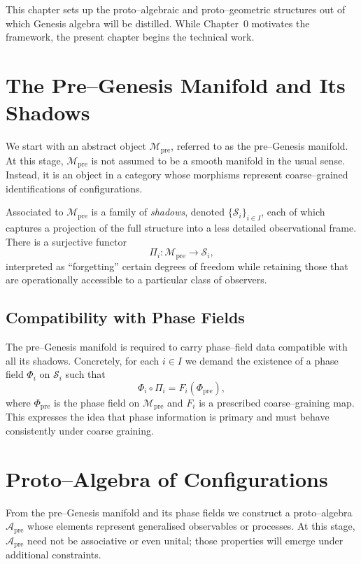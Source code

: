 This chapter sets up the proto--algebraic and proto--geometric structures out
of which Genesis algebra will be distilled. While Chapter~0 motivates the
framework, the present chapter begins the technical work.

\section{The Pre--Genesis Manifold and Its Shadows}
We start with an abstract object $\mathcal{M}_\mathrm{pre}$, referred to as
the pre--Genesis manifold. At this stage, $\mathcal{M}_\mathrm{pre}$ is not
assumed to be a smooth manifold in the usual sense. Instead, it is an object
in a category whose morphisms represent coarse--grained identifications of
configurations.

Associated to $\mathcal{M}_\mathrm{pre}$ is a family of \emph{shadows},
denoted $\{\mathcal{S}_i\}_{i \in I}$, each of which captures a projection of
the full structure into a less detailed observational frame. There is a
surjective functor
\begin{equation}
  \Pi_i : \mathcal{M}_\mathrm{pre} \to \mathcal{S}_i,
\end{equation}
interpreted as ``forgetting'' certain degrees of freedom while retaining
those that are operationally accessible to a particular class of observers.

\subsection{Compatibility with Phase Fields}
The pre--Genesis manifold is required to carry phase--field data compatible
with all its shadows. Concretely, for each $i \in I$ we demand the existence
of a phase field $\Phi_i$ on $\mathcal{S}_i$ such that
\begin{equation}
  \Phi_i \circ \Pi_i = F_i(\Phi_\mathrm{pre}),
\end{equation}
where $\Phi_\mathrm{pre}$ is the phase field on $\mathcal{M}_\mathrm{pre}$
and $F_i$ is a prescribed coarse--graining map. This expresses the idea that
phase information is primary and must behave consistently under coarse
graining.

\section{Proto--Algebra of Configurations}
From the pre--Genesis manifold and its phase fields we construct a
proto--algebra $\mathcal{A}_\mathrm{pre}$ whose elements represent
generalised observables or processes. At this stage, $\mathcal{A}_\mathrm{pre}$
need not be associative or even unital; those properties will emerge under
additional constraints.

